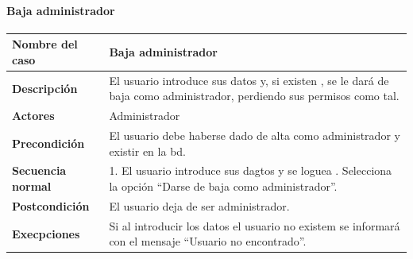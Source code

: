\paragraph{Baja administrador}
\begin{table}[H]
    \centering
    \small
    \begin{tabularx}{0.8\textwidth}{|p{3.5cm}|X|}
        \hline
        \rowcolor{lightgray}
        \textbf{Nombre del caso}  & \textbf{Baja administrador}                                                                                            \\
        \hline
        \textbf{Descripción}      & El usuario introduce sus datos y, si existen , se le dará de baja como administrador, perdiendo sus permisos como tal. \\
        \hline
        \textbf{Actores}          & Administrador                                                                                                          \\
        \hline
        \textbf{Precondición}     & El usuario debe haberse dado de alta como administrador y existir en la \gls{bd}.                                      \\
        \hline
        \textbf{Secuencia normal} & 1. El usuario introduce sus dagtos y se loguea \newline
        2. Selecciona la opción ``Darse de baja como administrador''.                                                                                      \\
        \hline
        \textbf{Postcondición}    & El usuario deja de ser administrador.                                                                                  \\
        \hline
        \textbf{Execpciones}      & Si al introducir los datos el usuario no existem se informará con el mensaje ``Usuario no encontrado''.                \\
        \hline
    \end{tabularx}
\end{table}
